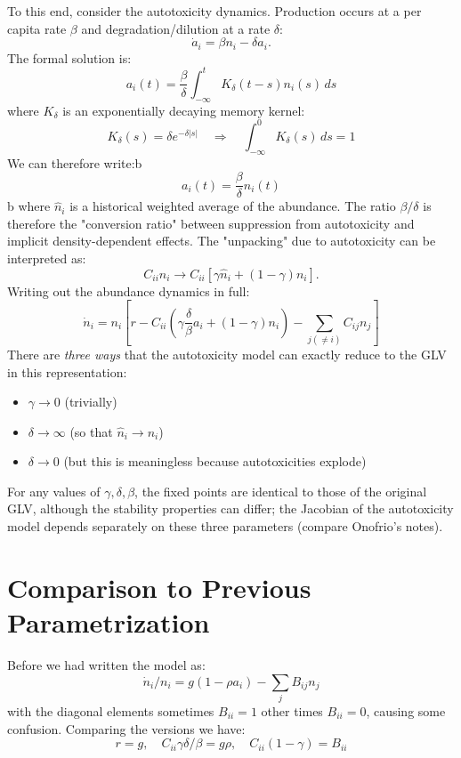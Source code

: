 \documentclass{article}
\begin{document}
To this end, consider the autotoxicity dynamics. Production occurs at a per capita rate $\beta$ and degradation/dilution at a rate $\delta$:
\begin{equation}
\dot{a}_i = \beta n_i - \delta a_i.
\end{equation}
The formal solution is:
\begin{equation}
a_i(t) = \frac{\beta}{\delta} \int_{-\infty}^t K_\delta(t-s) n_i(s)\, ds
\end{equation}
where $K_\delta$ is an exponentially decaying memory kernel:
\begin{equation}
K_\delta(s) = \delta e^{-\delta|s|} \quad \Rightarrow \quad \int_{-\infty}^0 K_\delta(s)\, ds = 1
\end{equation}
We can therefore write:b
\begin{equation}
a_i(t) = \frac{\beta}{\delta}\hat{n}_i(t)
\end{equation}b
where $\hat{n}_i$ is a historical weighted average of the abundance. The ratio $\beta/\delta$ is therefore the "conversion ratio" between suppression from autotoxicity and implicit density-dependent effects. The "unpacking" due to autotoxicity can be interpreted as:
\begin{equation}
C_{ii}n_i \rightarrow C_{ii}\left[ \gamma \hat{n}_i + (1-\gamma)n_i \right].
\end{equation}
Writing out the abundance dynamics in full:
\begin{equation}
\dot{n}_i = n_i\left[ r - C_{ii} \left(\gamma \frac{\delta}{\beta}a_i + (1-\gamma)n_i\right) - \sum_{j(\neq i)} C_{ij} n_j \right]
\end{equation}
There are \emph{three ways} that the autotoxicity model can exactly reduce to the GLV in this representation:
\begin{itemize}
  \item $\gamma \to 0$ (trivially)
  \item $\delta \to \infty$ (so that $\hat{n}_i \to n_i$)
  \item $\delta \to 0$ (but this is meaningless because autotoxicities explode)
\end{itemize}
For any values of $\gamma,\delta,\beta$, the fixed points are identical to those of the original GLV, although the stability properties can differ; the Jacobian of the autotoxicity model depends separately on these three parameters (compare Onofrio's notes).

\section{Comparison to Previous Parametrization}
Before we had written the model as:
\begin{equation}
\dot{n}_i / n_i = g ( 1 - \rho a_i ) - \sum_{j} B_{ij} n_j
\end{equation}
with the diagonal elements sometimes $B_{ii}=1$ other times $B_{ii}=0$, causing some confusion. Comparing the versions we have:
\begin{equation}
r=g, \quad C_{ii} \gamma \delta/\beta = g \rho, \quad C_{ii}(1-\gamma) = B_{ii}
\end{equation}
\end{document}
